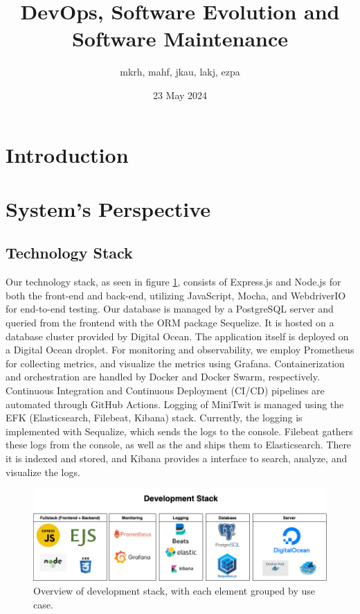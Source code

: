 \documentclass[11pt]{article}
\title{DevOps, Software Evolution and Software Maintenance}
\author{mkrh, mahf, jkau, lakj, ezpa}
\date{23 May 2024}
\begin{document}
\maketitle

\section{Introduction}


\section{System's Perspective}
\subsection{Technology Stack}
Our technology stack, as seen in figure \ref{fig:dev-stack}, consists of Express.js and Node.js for both the front-end and back-end, utilizing JavaScript, Mocha, and WebdriverIO for end-to-end testing. Our database is managed by a PostgreSQL server and queried from the frontend with the ORM package Sequelize. It is hosted on a database cluster provided by Digital Ocean. The application itself is deployed on a Digital Ocean droplet. For monitoring and observability, we employ Prometheus for collecting metrics, and visualize the metrics using Grafana. Containerization and orchestration are handled by Docker and Docker Swarm, respectively. Continuous Integration and Continuous Deployment (CI/CD) pipelines are automated through GitHub Actions. Logging of MiniTwit is managed using the EFK (Elasticsearch, Filebeat, Kibana) stack. Currently, the logging is implemented with Sequalize, which sends the logs to the console.  Filebeat gathers these logs from the console, as well as the  and ships them to Elasticsearch. There it is indexed and stored, and Kibana provides a interface to search, analyze, and visualize the logs.

\begin{figure}[!h]
    \centering
    \includegraphics[width=\textwidth]{images/techstack.png}
    \caption{Overview of development stack, with each element grouped by use case.}
    \label{fig:dev-stack}
\end{figure}
\end{document}
